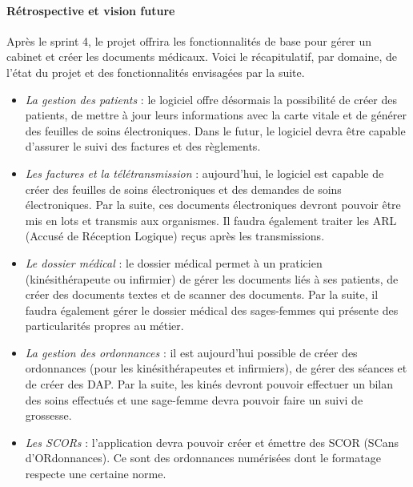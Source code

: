 \paragraph*{Rétrospective et vision future\\}
Après le sprint 4, le projet offrira les fonctionnalités de base pour gérer un cabinet et créer les documents médicaux.
Voici le récapitulatif, par domaine, de l'état du projet et des fonctionnalités envisagées par la suite.
\begin{itemize}
	\item \textit{La gestion des patients} : le logiciel offre désormais la possibilité de créer des patients, de mettre à jour leurs informations avec la carte vitale et de générer des feuilles de soins électroniques.
	Dans le futur, le logiciel devra être capable d'assurer le suivi des factures et des règlements.
	
	\item \textit{Les factures et la télétransmission} : aujourd'hui, le logiciel est capable de créer des feuilles de soins électroniques et des demandes de soins électroniques. Par la suite, ces documents électroniques devront pouvoir être mis en lots et transmis aux organismes. Il faudra également traiter les \gls{ARL} (Accusé de Réception Logique) reçus après les transmissions.
	
	\item \textit{Le dossier médical} : le dossier médical permet à un praticien (kinésithérapeute ou infirmier) de gérer les documents liés à ses patients, de créer des documents textes et de scanner des documents. Par la suite, il faudra également gérer le dossier médical des sages-femmes qui présente des particularités propres au métier.
	
	\item \textit{La gestion des ordonnances} : il est aujourd'hui possible de créer des ordonnances (pour les kinésithérapeutes et infirmiers), de gérer des séances et de créer des \gls{DAP}. Par la suite, les kinés devront pouvoir effectuer un bilan des soins effectués et une sage-femme devra pouvoir faire un suivi de grossesse.
	
	\item \textit{Les SCORs} : l'application devra pouvoir créer et émettre des \gls{SCOR} (SCans d'ORdonnances). Ce sont des ordonnances numérisées dont le formatage respecte une certaine norme.
\end{itemize} 

